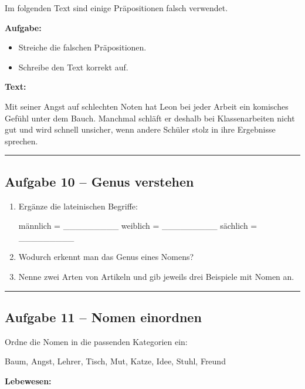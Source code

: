 \documentclass[a4paper,12pt]{article}
\newcommand{\linie}{\vspace{4pt}\hrule\vspace{10pt}}
\begin{document}
Im folgenden Text sind einige Präpositionen falsch verwendet.

\textbf{Aufgabe:}
\begin{itemize}
\item Streiche die falschen Präpositionen.
\item Schreibe den Text korrekt auf.
\end{itemize}

\textbf{Text:}

Mit seiner Angst auf schlechten Noten hat Leon bei jeder Arbeit ein komisches Gefühl unter dem Bauch.  
Manchmal schläft er deshalb bei Klassenarbeiten nicht gut und wird schnell unsicher, wenn andere Schüler stolz in ihre Ergebnisse sprechen.

\vspace{30pt}

\linie

\subsection*{Aufgabe 10 – Genus verstehen}

\begin{enumerate}
\item Ergänze die lateinischen Begriffe:

männlich = \_\_\_\_\_\_\_\_\_  
weiblich = \_\_\_\_\_\_\_\_\_  
sächlich = \_\_\_\_\_\_\_\_\_  

\item Wodurch erkennt man das Genus eines Nomens?

\vspace{10pt}

\item Nenne zwei Arten von Artikeln und gib jeweils drei Beispiele mit Nomen an.
\end{enumerate}

\linie

\subsection*{Aufgabe 11 – Nomen einordnen}

Ordne die Nomen in die passenden Kategorien ein:

Baum, Angst, Lehrer, Tisch, Mut, Katze, Idee, Stuhl, Freund

\textbf{Lebewesen:}

\vspace{10pt}
\end{document}
